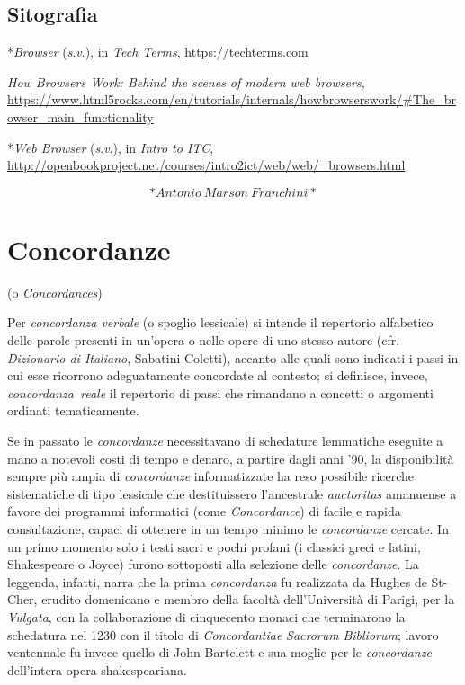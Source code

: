\documentclass[
  b5paper,
  twoside,
  12pt,
  chapterprefix=false,
  bibliography=totocnumbered,
  parskip=false]{scrbook}
\begin{document}
\hypertarget{sitografia-3}{%
\section*{Sitografia}\label{sitografia-3}}

*\emph{Browser} (\emph{s}.\emph{v}.), in \emph{Tech Terms},
\url{https://techterms.com}

\emph{How Browsers Work: Behind the scenes of modern web browsers},
\url{https://www.html5rocks.com/en/tutorials/internals/howbrowserswork/\#The_browser_main_functionality}

*\emph{Web Browser} (\emph{s}.\emph{v}.), in \emph{Intro to ITC},
\url{http://openbookproject.net/courses/intro2ict/web/web/_browsers.html}

\[*Antonio~Marson~Franchini*\]

\hypertarget{concordanze}{%
\chapter{Concordanze}\label{concordanze}}

(o \emph{Concordances})

Per \emph{concordanza verbale} (o spoglio lessicale) si intende il repertorio
alfabetico delle parole presenti in un'opera o nelle opere di uno stesso
autore (cfr. \emph{Dizionario di Italiano}, Sabatini-Coletti), accanto alle
quali sono indicati i passi in cui esse ricorrono adeguatamente
concordate al contesto; si definisce, invece, \emph{concordanza~reale} il
repertorio di passi che rimandano a concetti o argomenti ordinati
tematicamente.

Se in passato le \emph{concordanze} necessitavano di schedature lemmatiche
eseguite a mano a notevoli costi di tempo e denaro, a partire dagli anni
'90, la disponibilità sempre più ampia di \emph{concordanze} informatizzate
ha reso possibile ricerche sistematiche di tipo lessicale che
destituissero l'ancestrale \emph{auctoritas} amanuense a favore dei programmi
informatici (come \emph{Concordance}) di facile e rapida consultazione,
capaci di ottenere in un tempo minimo le \emph{concordanze} cercate. In un
primo momento solo i testi sacri e pochi profani (i classici greci e
latini, Shakespeare o Joyce) furono sottoposti alla selezione delle
\emph{concordanze}. La leggenda, infatti, narra che la prima \emph{concordanza} fu
realizzata da Hughes de St-Cher, erudito domenicano e membro della
facoltà dell'Università di Parigi, per la \emph{Vulgata}, con la
collaborazione di cinquecento monaci che terminarono la schedatura nel
1230 con il titolo di \emph{Concordantiae} \emph{Sacrorum} \emph{Bibliorum}; lavoro
ventennale fu invece quello di John Bartelett e sua moglie per le
\emph{concordanze} dell'intera opera shakespeariana.
\end{document}
